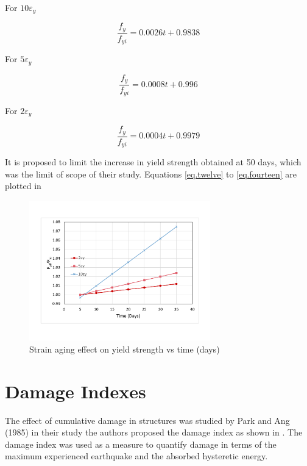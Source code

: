For $10\varepsilon_y$

\begin{equation}
  \frac{f_y}{f_{yi}}=0.0026t+0.9838
  \label{eq.twelve}
\end{equation} 

For $5\varepsilon_y$

\begin{equation}
  \frac{f_y}{f_{yi}}=0.0008t+0.996
  \label{eq.thirteen}
\end{equation} 

For $2\varepsilon_y$

\begin{equation}
  \frac{f_y}{f_{yi}}=0.0004t+0.9979
  \label{eq.fourteen}
\end{equation} 

It is proposed to limit the increase in yield strength obtained at 50 days, which was the limit of scope of their study. Equations \ref{eq.twelve} to  \ref{eq.fourteen} are plotted in 

\begin{figure}[htbp]
\centering
\includegraphics[width=0.7\textwidth]{Chapter-2/figs/StrainAging_TimeDependent}
\caption{Strain aging effect on yield strength vs time (days)}
\label{fig:hist4}
\end{figure}

\section{Damage Indexes}
The effect of cumulative damage in structures was studied by Park and Ang (1985) \cite{Young-JiPark1985} in their study the authors proposed the damage index as shown in . The damage index was used as a measure to quantify damage in terms of the maximum experienced earthquake and the absorbed hysteretic energy.


